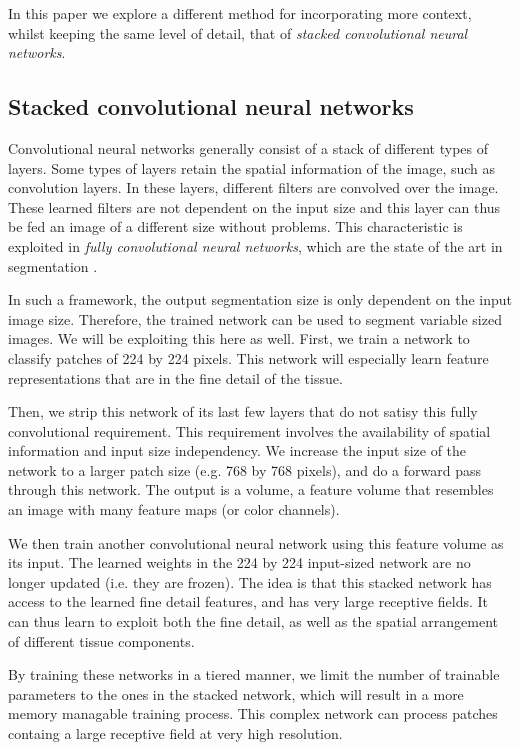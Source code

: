\documentclass[journal]{IEEEtran}
\begin{document}
In this paper we explore a different method for incorporating more context, whilst keeping the same level of detail, that of \emph{stacked convolutional neural networks}.  

\subsection{Stacked convolutional neural networks}
Convolutional neural networks generally consist of a stack of different types of layers. Some types of layers retain the spatial information of the image, such as convolution layers. In these layers, different filters are convolved over the image. These learned filters are not dependent on the input size and this layer can thus be fed an image of a different size without problems. This characteristic is exploited in \emph{fully convolutional neural networks}, which are the state of the art in segmentation \cite{long2015fully}. 

In such a framework, the output segmentation size is only dependent on the input image size.  Therefore, the trained network can be used to segment variable sized images. We will be exploiting this here as well. First, we train a network to classify patches of 224 by 224 pixels. This network will especially learn feature representations that are in the fine detail of the tissue. 

Then, we strip this network of its last few layers that do not satisy this fully convolutional requirement. This requirement involves the availability of spatial information and input size independency. We increase the input size of the network to a larger patch size (e.g. 768 by 768 pixels), and do a forward pass through this network. The output is a volume, a feature volume  that resembles an image with many feature maps (or color channels). 

We then train another convolutional neural network using this feature volume as its input. The learned weights in the 224 by 224 input-sized network are no longer updated (i.e. they are frozen). The idea is that this stacked network has access to the learned fine detail features, and has very large receptive fields. It can thus learn to exploit both the fine detail, as well as the spatial arrangement of different tissue components.

By training these networks in a tiered manner, we limit the number of trainable parameters to the ones in the stacked network, which will result in a more memory managable training process. This complex network can process patches containg a large receptive field at very high resolution. 
\end{document}
